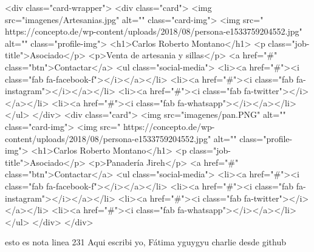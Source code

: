 <div class="card-wrapper">
  <div class="card">
    <img src="imagenes/Artesanias.jpg" alt="" class="card-img">
    <img src=" https://concepto.de/wp-content/uploads/2018/08/persona-e1533759204552.jpg" alt="" class="profile-img">
    <h1>Carlos Roberto Montano</h1>
    <p class="job-title">Asociado</p>
    <p>Venta de artesania y sillas</p>
    <a href="#" class="btn">Contactar</a>
    <ul class="social-media">
      <li><a href="#"><i class="fab fa-facebook-f"></i></a></li> 
      <li><a href="#"><i class="fab fa-instagram"></i></a></li>   
      <li><a href="#"><i class="fab fa-twitter"></i></a></li>   
      <li><a href="#"><i class="fab fa-whatsapp"></i></a></li>     
    </ul>
  </div>
<div class="card">
    <img src="imagenes/pan.PNG" alt="" class="card-img">
    <img src=" https://concepto.de/wp-content/uploads/2018/08/persona-e1533759204552.jpg" alt="" class="profile-img">
    <h1>Carlos Roberto Montano</h1>
    <p class="job-title">Asociado</p>
    <p>Panadería Jireh</p>
    <a href="#" class="btn">Contactar</a>
    <ul class="social-media">
      <li><a href="#"><i class="fab fa-facebook-f"></i></a></li> 
      <li><a href="#"><i class="fab fa-instagram"></i></a></li>   
      <li><a href="#"><i class="fab fa-twitter"></i></a></li>   
      <li><a href="#"><i class="fab fa-whatsapp"></i></a></li>     
    </ul>
  </div>
</div>

esto es nota linea 231
Aqui escribi yo, Fátima
yguygyu
charlie desde github
